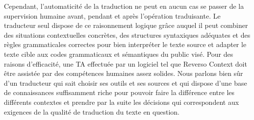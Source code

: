 \documentclass{textolivre}
\begin{document}
Cependant, l’automaticité de la traduction ne peut en aucun cas se passer de la supervision humaine avant, pendant et après l’opération traduisante. Le traducteur seul dispose de ce raisonnement logique grâce auquel il peut combiner des situations contextuelles concrètes, des structures syntaxiques adéquates et des règles grammaticales correctes pour bien interpréter le texte source et adapter le texte cible aux codes grammaticaux et sémantiques du public visé. Pour des raisons d’efficacité, une TA effectuée par un logiciel tel que Reverso Context doit être assistée par des compétences humaines assez solides. Nous parlons bien sûr d’un traducteur qui sait choisir ses outils et ses sources et qui dispose d’une base de connaissances suffisamment riche pour pouvoir faire la différence entre les différents contextes et prendre par la suite les décisions qui correspondent aux exigences de la qualité de traduction du texte en question.
\end{document}
